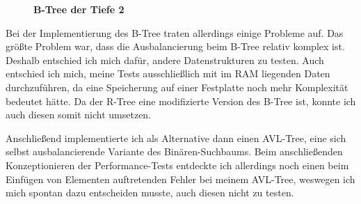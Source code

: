 \documentclass[11pt,a4paper]{article}
\begin{document}
\begin{figure}[H]
    \begin{center}
    \end{center}
    \caption{\textbf{B-Tree der Tiefe 2}}
\end{figure}

Bei der Implementierung des B-Tree traten allerdings einige Probleme auf.
Das größte Problem war, dass die Ausbalancierung beim B-Tree relativ komplex ist.
Deshalb entschied ich mich dafür, andere Datenstrukturen zu testen.
Auch entschied ich mich, meine Tests ausschließlich mit im RAM liegenden Daten
durchzuführen, da eine Speicherung auf einer Festplatte noch mehr Komplexität bedeutet
hätte. Da der R-Tree eine modifizierte Version des B-Tree ist, konnte ich auch diesen
somit nicht umsetzen.

\vspace*{0.5cm}

Anschließend implementierte ich als Alternative dann einen AVL-Tree, eine sich selbst
ausbalancierende Variante des Binären-Suchbaums. Beim anschließenden
Konzeptionieren der Performance-Tests entdeckte ich allerdings noch einen
beim Einfügen von Elementen auftretenden Fehler bei meinem AVL-Tree,
weswegen ich mich spontan dazu entscheiden musste, auch diesen nicht zu testen.
\end{document}
